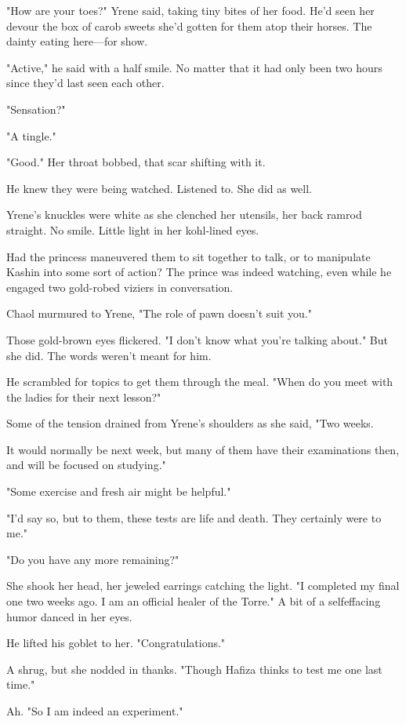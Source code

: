 "How are your toes?"
Yrene said, taking tiny bites of her food.
He'd seen her devour the box of carob sweets she'd gotten for them atop their horses.
The dainty eating here---for show.

"Active," he said with a half smile.
No matter that it had only been two hours since they'd last seen each other.

"Sensation?"

"A tingle."

"Good."
Her throat bobbed, that scar shifting with it.

He knew they were being watched.
Listened to.
She did as well.

Yrene's knuckles were white as she clenched her utensils, her back ramrod straight.
No smile.
Little light in her kohl-lined eyes.

Had the princess maneuvered them to sit together to talk, or to manipulate Kashin into some sort of action?
The prince was indeed watching, even while he engaged two gold-robed viziers in conversation.

Chaol murmured to Yrene, "The role of pawn doesn't suit you."

Those gold-brown eyes flickered.
"I don't know what you're talking about."
But she did.
The words weren't meant for him.

He scrambled for topics to get them through the meal.
"When do you meet with the ladies for their next lesson?"

Some of the tension drained from Yrene's shoulders as she said, "Two weeks.

It would normally be next week, but many of them have their examinations then, and will be focused on studying."

"Some exercise and fresh air might be helpful."

"I'd say so, but to them, these tests are life and death.
They certainly were to me."

"Do you have any more remaining?"

She shook her head, her jeweled earrings catching the light.
"I completed my final one two weeks ago.
I am an official healer of the Torre."
A bit of a selfeffacing humor danced in her eyes.

He lifted his goblet to her.
"Congratulations."

A shrug, but she nodded in thanks.
"Though Hafiza thinks to test me one last time."

Ah.
"So I am indeed an experiment."

